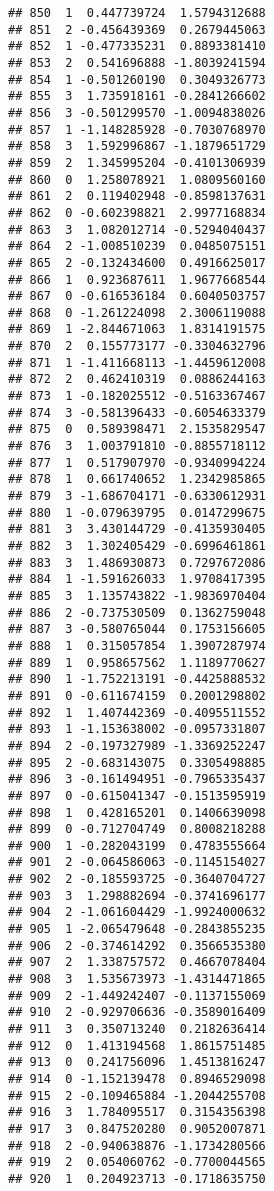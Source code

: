 \documentclass[
]{article}
\begin{document}
\begin{verbatim}
## 850  1  0.447739724  1.5794312688
## 851  2 -0.456439369  0.2679445063
## 852  1 -0.477335231  0.8893381410
## 853  2  0.541696888 -1.8039241594
## 854  1 -0.501260190  0.3049326773
## 855  3  1.735918161 -0.2841266602
## 856  3 -0.501299570 -1.0094838026
## 857  1 -1.148285928 -0.7030768970
## 858  3  1.592996867 -1.1879651729
## 859  2  1.345995204 -0.4101306939
## 860  0  1.258078921  1.0809560160
## 861  2  0.119402948 -0.8598137631
## 862  0 -0.602398821  2.9977168834
## 863  3  1.082012714 -0.5294040437
## 864  2 -1.008510239  0.0485075151
## 865  2 -0.132434600  0.4916625017
## 866  1  0.923687611  1.9677668544
## 867  0 -0.616536184  0.6040503757
## 868  0 -1.261224098  2.3006119088
## 869  1 -2.844671063  1.8314191575
## 870  2  0.155773177 -0.3304632796
## 871  1 -1.411668113 -1.4459612008
## 872  2  0.462410319  0.0886244163
## 873  1 -0.182025512 -0.5163367467
## 874  3 -0.581396433 -0.6054633379
## 875  0  0.589398471  2.1535829547
## 876  3  1.003791810 -0.8855718112
## 877  1  0.517907970 -0.9340994224
## 878  1  0.661740652  1.2342985865
## 879  3 -1.686704171 -0.6330612931
## 880  1 -0.079639795  0.0147299675
## 881  3  3.430144729 -0.4135930405
## 882  3  1.302405429 -0.6996461861
## 883  3  1.486930873  0.7297672086
## 884  1 -1.591626033  1.9708417395
## 885  3  1.135743822 -1.9836970404
## 886  2 -0.737530509  0.1362759048
## 887  3 -0.580765044  0.1753156605
## 888  1  0.315057854  1.3907287974
## 889  1  0.958657562  1.1189770627
## 890  1 -1.752213191 -0.4425888532
## 891  0 -0.611674159  0.2001298802
## 892  1  1.407442369 -0.4095511552
## 893  1 -1.153638002 -0.0957331807
## 894  2 -0.197327989 -1.3369252247
## 895  2 -0.683143075  0.3305498885
## 896  3 -0.161494951 -0.7965335437
## 897  0 -0.615041347 -0.1513595919
## 898  1  0.428165201  0.1406639098
## 899  0 -0.712704749  0.8008218288
## 900  1 -0.282043199  0.4783555664
## 901  2 -0.064586063 -0.1145154027
## 902  2 -0.185593725 -0.3640704727
## 903  3  1.298882694 -0.3741696177
## 904  2 -1.061604429 -1.9924000632
## 905  1 -2.065479648 -0.2843855235
## 906  2 -0.374614292  0.3566535380
## 907  2  1.338757572  0.4667078404
## 908  3  1.535673973 -1.4314471865
## 909  2 -1.449242407 -0.1137155069
## 910  2 -0.929706636 -0.3589016409
## 911  3  0.350713240  0.2182636414
## 912  0  1.413194568  1.8615751485
## 913  0  0.241756096  1.4513816247
## 914  0 -1.152139478  0.8946529098
## 915  2 -0.109465884 -1.2044255708
## 916  3  1.784095517  0.3154356398
## 917  3  0.847520280  0.9052007871
## 918  2 -0.940638876 -1.1734280566
## 919  2  0.054060762 -0.7700044565
## 920  1  0.204923713 -0.1718635750

\end{verbatim}
\end{document}
